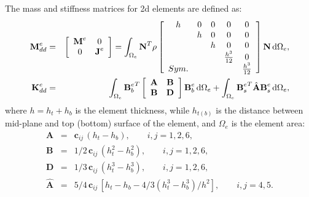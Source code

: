 The mass and stiffness matrices for \ac{2d} elements are defined as:
\begin{eqnarray}
	\textbf{M}_{dd}^e & = &
	\left [
	\begin{array}{cc}
		\textbf{M}^e & 0\\
		0 & \textbf{J}^e
	\end{array}
	\right] =
	\int_{\Omega_e}\textbf{N}^T\rho
	\left [
	\begin{array}{ccccc}
		h & 0 & 0 & 0 & 0 \\
		& h & 0 & 0 & 0 \\
		&  & h & 0 & 0\\
		&  &  & \frac{h^3}{12} & 0\\
		Sym. &  &  &  & \frac{h^3}{12}
	\end{array} \right]
	\textbf{N} \mathop{}\!\mathrm{d}\Omega_e,\\
	\textbf{K}_{dd}^e & = & \int_{\Omega_e}{\textbf{B}_b^e}^T
	\left[
	\begin{array}{cc}
		\textbf{A} & \textbf{B}\\
		\textbf{B} & \textbf{D}
	\end{array} \right]
	\textbf{B}_b^e \mathop{}\!\mathrm{d} \Omega_e+\int_{\Omega_e}{\textbf{B}_s^e}^T\hat{\textbf{A}}\textbf{B}_s^e\mathop{}\!\mathrm{d} \Omega_e,
\end{eqnarray}
where \(h=h_t+h_b\) is the element thickness, while \(h_{t(b)}\) is the distance between mid-plane and top (bottom) surface of the element, and \(\Omega_e\) is the element area:
\begin{eqnarray}
	\textbf{A} & = & \textbf{c}_{ij}\,(h_t-h_b),\qquad i,j=1,2,6\nonumber,\\
	\textbf{B} & = & 1/2\, \textbf{c}_{ij}\,(h_t^2-h_b^2),\qquad i,j=1,2,6\nonumber,\\
	\textbf{D} & = & 1/3\, \textbf{c}_{ij}\,(h_t^3-h_b^3),\qquad i,j=1,2,6\nonumber,\\
	\hat{\textbf{A}} & = & 5/4\, \textbf{c}_{ij}\,\left[h_t-h_b-4/3\left(h_t^3-h_b^3\right)/h^2\right],\qquad i,j=4,5.
\end{eqnarray}
